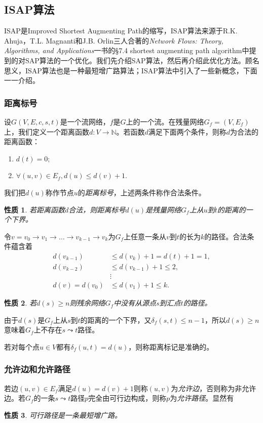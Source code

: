 \documentclass[a4paper]{ctexbook}
\newtheorem{property}{性质}[chapter]
\begin{document}

  \subsection{ISAP算法}
  ISAP是Improved Shortest Augmenting Path的缩写，ISAP算法来源于R.K. Ahuja，T.L. Magnanti和J.B. Orlin三人合著的\emph{Network Flows: Theory, Algorithms, and Applications}一书的\S 7.4 shortest augmenting path algorithm中提到的对SAP算法的一个优化。我们先介绍SAP算法，然后再介绍此优化方法。顾名思义，ISAP算法也是一种最短增广路算法；ISAP算法中引入了一些新概念，下面一一介绍。
  \subsubsection*{距离标号}
  设$G(V,E,c,s,t)$是一个流网络，$f$是$G$上的一个流。在残量网络$G_f=(V,E_f)$上，我们定义一个距离函数$d\colon V\to\mathbb{N}$。若函数$d$满足下面两个条件，则称$d$为合法的距离函数：
  \begin{enumerate}
      \item $d(t) = 0$;
      \item $\forall (u,v)\in E_f, d(u) \le d(v) +1$.
  \end{enumerate}
  我们把$d(u)$称作节点$u$的\emph{距离标号}，上述两条件称作合法条件。
  \begin{property}\label{P:lower_bound}
      若距离函数$d$合法，则距离标号$d(u)$是残量网络$G_f$上从$u$到$t$的距离的一个下界。
  \end{property}
  令$v=v_0\to v_1 \to\dots\to v_{k-1}\to v_k$为$G_f$上任意一条从$v$到$t$的长为$k$的路径。合法条件蕴含着
  \begin{align*}
      d(v_{k-1})&\le d(v_k)+1 = d(t)+1=1,\\
      d(v_{k-2})&\le d(v_{k-1})+1\le 2,\\
       &\vdots\\
      d(v) = d(v_0)&\le d(v_1) + 1 \le k.
  \end{align*}
  \begin{property}
      若$d(s)\ge n$则残余网络$G_f$中没有从源点$s$到汇点$t$的路径。
  \end{property}
  由于$d(s)$是$G_f$上从$s$到$t$的距离的一个下界，又$\delta_f(s,t)\le n-1$，所以$d(s)\ge n$意味着$G_f$上不存在$s\leadsto t$路径。

  若对每个点$u\in V$都有$\delta_f(u,t)=d(u)$，则称距离标记是准确的。
  \subsubsection*{允许边和允许路径}
  若边$(u,v)\in E_f$满足$d(u)=d(v)+1$则称$(u,v)$为\emph{允许边}，否则称为非允许边。若$G_f$的一条$s\leadsto t$路径$p$完全由可行边构成，则称$p$为\emph{允许路径}。显然有
  \begin{property}
    可行路径是一条最短增广路。
  \end{property}
\end{document}

